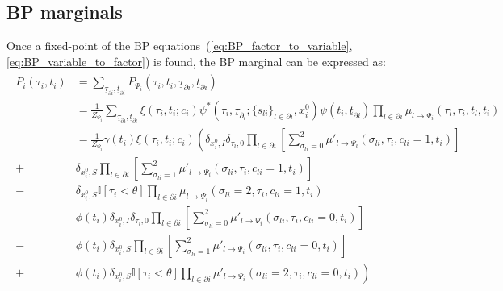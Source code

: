 \documentclass[a4paper, amsfonts, amssymb, amsmath, reprint, showkeys, nofootinbib, twoside, floatfix, pre,superscriptaddress, onecolumn]{revtex4-2}
\begin{document}
\subsection{BP marginals}
Once a fixed-point of the BP equations~(\ref{eq:BP_factor_to_variable},\ref{eq:BP_variable_to_factor}) is found, the BP marginal can be expressed as:
\begin{align}
\label{eq:BP_marginal}
\begin{aligned}
	P_i(\tau_i, t_i) &= \sum_{\underline{\tau}_{\partial i},\underline{t}_{\partial i}}P_{\Psi_i}(\tau_i, t_i, \underline{\tau}_{\partial i},\underline{t}_{\partial i}) \\
	&= \frac{1}{Z_{\Psi_i}}\sum_{\underline{\tau}_{\partial i},\underline{t}_{\partial i}}\xi(\tau_i, t_i;c_i)\psi^*(\tau_i, \underline{\tau}_{\partial_i};\{s_{li}\}_{l\in\partial i},x_i^0)\psi(t_i,\underline{t}_{\partial i})\prod_{l\in\partial i}\mu_{l\to\Psi_i}(\tau_l,\tau_i, t_l, t_i) \\
	&= \frac{1}{Z_{\Psi_i}}\gamma(t_i)\xi(\tau_i, t_i; c_i) \left(\delta_{x_i^0,I}\delta_{\tau_i,0}\prod_{l\in\partial i}\left[\sum_{\sigma_{li}=0}^2\mu'_{l\to\Psi_i}(\sigma_{li}, \tau_i, c_{li}=1, t_i)\right]\right. \\
	+& \delta_{x_i^0,S}\prod_{l\in\partial i}\left[\sum_{\sigma_{li}=1}^2\mu'_{l\to \Psi_i}(\sigma_{li}, \tau_i, c_{li}=1, t_i)\right] \\
	-& \delta_{x_i^0,S}\mathbb{I}[\tau_i<\theta]\prod_{l\in\partial i}\mu_{l\to \Psi_i}(\sigma_{li}=2, \tau_i, c_{li}=1, t_i) \\
	-&\phi(t_i)\delta_{x_i^0,I}\delta_{\tau_i,0}\prod_{l\in\partial i}\left[\sum_{\sigma_{li}=0}^2\mu'_{l\to\Psi_i}(\sigma_{li}, \tau_i, c_{li}=0, t_i)\right]\\
	-&\phi(t_i)\delta_{x_i^0,S}\prod_{l\in\partial i}\left[\sum_{\sigma_{li}=1}^2\mu'_{l\to \Psi_i}(\sigma_{li}, \tau_i, c_{li}=0, t_i)\right]\\
	+&\left.\phi(t_i) \delta_{x_i^0,S}\mathbb{I}[\tau_i<\theta]\prod_{l\in\partial i}\mu'_{l\to \Psi_i}(\sigma_{li}=2, \tau_i, c_{li}=0, t_i)\right)
\end{aligned}
\end{align}
\end{document}
